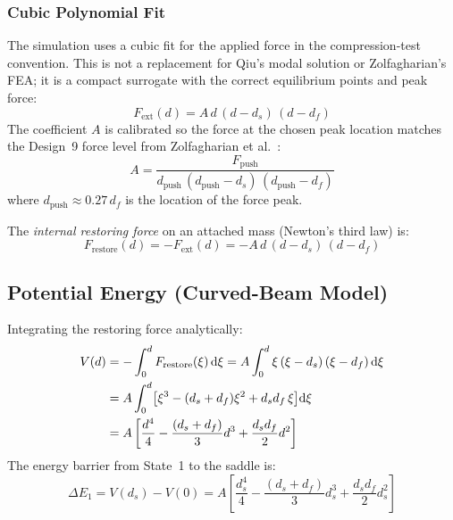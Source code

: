 \documentclass[11pt,letterpaper]{article}
\newcommand{\diff}{\mathrm{d}}
\begin{document}
\subsubsection{Cubic Polynomial Fit}
\label{sssec:cubic}

The simulation uses a cubic fit for the applied force in the compression-test
convention. This is not a replacement for Qiu's modal solution or
Zolfagharian's FEA; it is a compact surrogate with the correct equilibrium
points and peak force:
\begin{equation}
  F_{\mathrm{ext}}(d) = A\,d\,(d - d_s)\,(d - d_f)
  \label{eq:Fext_cubic}
\end{equation}
The coefficient $A$ is calibrated so the force at the chosen peak location
matches the Design~9 force level from Zolfagharian et al.~\cite{zolfagharian2025}:
\begin{equation}
  A = \frac{F_{\mathrm{push}}}{d_{\mathrm{push}}\,(d_{\mathrm{push}} - d_s)\,(d_{\mathrm{push}} - d_f)}
  \label{eq:Acoeff}
\end{equation}
where $d_{\mathrm{push}} \approx 0.27\,d_f$ is the location of the force peak.

The \emph{internal restoring force} on an attached mass (Newton's third law)
is:
\begin{equation}
  F_{\mathrm{restore}}(d) = -F_{\mathrm{ext}}(d) = -A\,d\,(d - d_s)\,(d - d_f)
  \label{eq:Frestore2}
\end{equation}

\subsection{Potential Energy (Curved-Beam Model)}
\label{ssec:potential2}

Integrating the restoring force analytically:
\begin{align}
  V(d) &= -\int_0^d F_{\mathrm{restore}}(\xi)\,\diff\xi
         = A\int_0^d \xi\,(\xi-d_s)\,(\xi-d_f)\,\diff\xi \notag\\
       &= A\int_0^d \bigl[\xi^3 - (d_s+d_f)\xi^2 + d_s d_f\,\xi\bigr]\diff\xi \notag\\
       &= A\left[\frac{d^4}{4} - \frac{(d_s+d_f)}{3}d^3 + \frac{d_s d_f}{2}d^2\right]
  \label{eq:V2}
\end{align}
The energy barrier from State~1 to the saddle is:
\begin{equation}
  \Delta E_1 = V(d_s) - V(0)
  = A\left[\frac{d_s^4}{4} - \frac{(d_s+d_f)}{3}d_s^3 + \frac{d_s d_f}{2}d_s^2\right]
  \label{eq:barrier2}
\end{equation}
\end{document}
